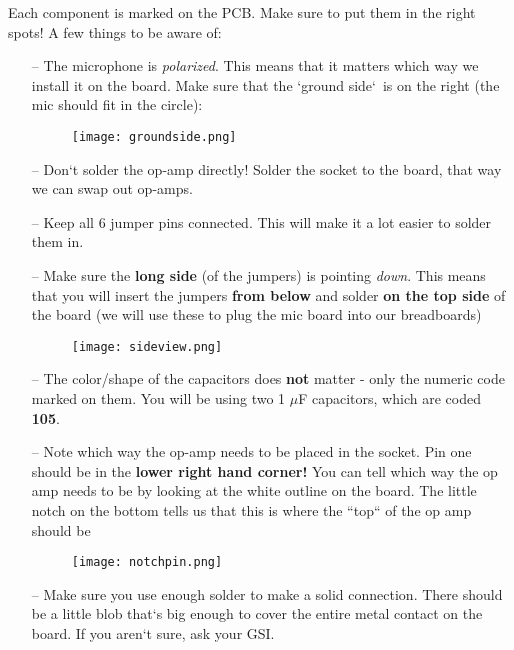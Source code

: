 \documentclass{tufte-handout}
\begin{document}
\bigskip
Each component is marked on the PCB. Make sure to put them in the right spots! A few things to be aware of:
\begin{itemize}
\item[--] The microphone is \textit{polarized}. This means that it matters which way we install it on the board. Make sure that the `ground side`\ is on the right (the mic should fit in the circle):
\begin{figure}
  \texttt{[image: groundside.png]}
  \label{fig:textfig}
\end{figure}
\item[--] Don`t solder the op-amp directly! Solder the socket to the board, that way we can swap out op-amps.
\item[--] Keep all 6 jumper pins connected. This will make it a lot easier to solder them in.
\item[--] Make sure the \textbf{long side} (of the jumpers) is pointing \textit{down}. This means that you will insert the jumpers \textbf{from below} and solder  \textbf{on the top side} of the board (we will use these to plug the mic board into our breadboards)

\begin{figure*}[h!]
  \texttt{[image: sideview.png]}
  \label{fig:textfig}
\end{figure*}

\item[--] The color/shape of the capacitors does \textbf{not} matter - only the numeric code marked on them. You will be using two 1 $\mu$F capacitors, which are coded \textbf{105}.
\item[--] Note which way the op-amp needs to be placed in the socket. Pin one should be in the \textbf{lower right hand corner!} You can tell which way the op amp needs to be by looking at the white outline on the board. The little notch on the bottom tells us that this is where the ``top`` of the op amp should be

\begin{figure*}[h!]
  \texttt{[image: notchpin.png]}\centering\nonumber
  \label{fig:textfig}
\end{figure*}

\item[--] Make sure you use enough solder to make a solid connection. There should be a little blob that`s big enough to cover the entire metal contact on the board. If you aren`t sure, ask your GSI.
\end{itemize}
\newpage
\end{document}
